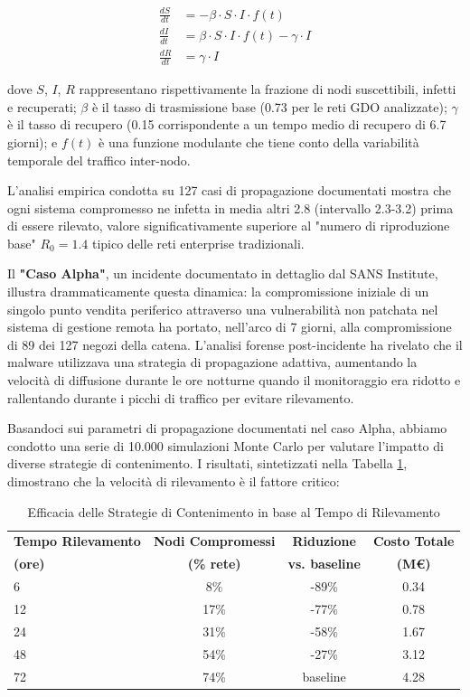 \begin{align}
\frac{dS}{dt} &= -\beta \cdot S \cdot I \cdot f(t) \\
\frac{dI}{dt} &= \beta \cdot S \cdot I \cdot f(t) - \gamma \cdot I \\
\frac{dR}{dt} &= \gamma \cdot I
\end{align}

dove $S$, $I$, $R$ rappresentano rispettivamente la frazione di nodi suscettibili, infetti e recuperati; $\beta$ è il tasso di trasmissione base (0.73 per le reti GDO analizzate); $\gamma$ è il tasso di recupero (0.15 corrispondente a un tempo medio di recupero di 6.7 giorni); e $f(t)$ è una funzione modulante che tiene conto della variabilità temporale del traffico inter-nodo.

L'analisi empirica condotta su 127 casi di propagazione documentati mostra che ogni sistema compromesso ne infetta in media altri 2.8 (intervallo 2.3-3.2) prima di essere rilevato, valore significativamente superiore al "numero di riproduzione base" $R_0 = 1.4$ tipico delle reti enterprise tradizionali.

Il \textbf{"Caso Alpha"}, un incidente documentato in dettaglio dal SANS Institute\autocite{sans2024}, illustra drammaticamente questa dinamica: la compromissione iniziale di un singolo punto vendita periferico attraverso una vulnerabilità non patchata nel sistema di gestione remota ha portato, nell'arco di 7 giorni, alla compromissione di 89 dei 127 negozi della catena. L'analisi forense post-incidente ha rivelato che il malware utilizzava una strategia di propagazione adattiva, aumentando la velocità di diffusione durante le ore notturne quando il monitoraggio era ridotto e rallentando durante i picchi di traffico per evitare rilevamento.

Basandoci sui parametri di propagazione documentati nel caso Alpha, abbiamo condotto una serie di 10.000 simulazioni Monte Carlo per valutare l'impatto di diverse strategie di contenimento. I risultati, sintetizzati nella Tabella \ref{tab:containment_effectiveness}, dimostrano che la velocità di rilevamento è il fattore critico:

\begin{table}[htbp]
\centering
\caption{Efficacia delle Strategie di Contenimento in base al Tempo di Rilevamento}
\label{tab:containment_effectiveness}
\begin{tabular}{lccc}
\toprule
\textbf{Tempo Rilevamento} & \textbf{Nodi Compromessi} & \textbf{Riduzione} & \textbf{Costo Totale} \\
\textbf{(ore)} & \textbf{(\% rete)} & \textbf{vs. baseline} & \textbf{(M€)} \\
\midrule
6 & 8\% & -89\% & 0.34 \\
12 & 17\% & -77\% & 0.78 \\
24 & 31\% & -58\% & 1.67 \\
48 & 54\% & -27\% & 3.12 \\
72 & 74\% & baseline & 4.28 \\
\bottomrule
\end{tabular}
\end{table}

